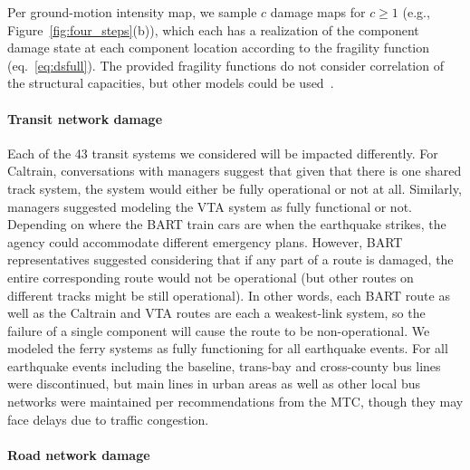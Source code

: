 %

Per ground-motion intensity map, we sample $c$ damage maps for $c \geq 1$ (e.g., Figure~\ref{fig:four_steps}{(b)}), which each has a realization of the component damage state at each component location according to the fragility function (eq.~\ref{eq:dsfull}). The provided fragility functions do not consider correlation of the structural capacities, but other models could be used~\cite[e.g.,][]{lee_uncertainty_2007}.

\paragraph{Transit network damage}
\label{sec:transitDamage}
Each of the 43 transit systems we considered will be impacted differently. For Caltrain, conversations with managers suggest that given that there is one shared track system, the system would either be fully operational or  not at all. Similarly, managers suggested modeling the VTA system as fully functional or not. Depending on where the BART train cars are when the earthquake strikes, the agency could accommodate different emergency plans. However, BART representatives suggested considering that if any part of a route is damaged, the entire corresponding route would not be operational (but other routes on different tracks might be still operational).  In other words, each BART route as well as the Caltrain and VTA routes are each a weakest-link system,  so the failure of a single component  will cause the route to be non-operational. We modeled the ferry systems as fully functioning for all earthquake events. For all earthquake events including the baseline, trans-bay and cross-county bus lines were discontinued, but main lines in urban areas as well as other local bus networks were maintained per recommendations from the MTC, though they may face delays due to traffic congestion. 

\paragraph{Road network damage}

